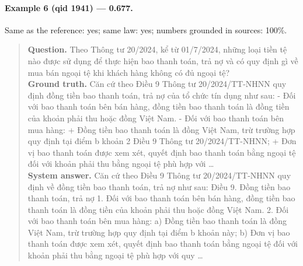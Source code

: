 \paragraph{Example 6 (qid 1941) --- \rl{} 0.677.} Same \dieu{} as the reference: yes; same law: yes; numbers grounded in sources: 100\%.
\begin{quote}\small\textbf{Question.} Theo Thông tư 20/2024, kể từ 01/7/2024, những loại tiền tệ nào được sử dụng để thực hiện bao thanh toán, trả nợ và có quy định gì về mua bán ngoại tệ khi khách hàng không có đủ ngoại tệ?\\[2pt]
\textbf{Ground truth.} Căn cứ theo Điều 9 Thông tư 20/2024/TT-NHNN quy định đồng tiền bao thanh toán, trả nợ của tổ chức tín dụng như sau: - Đối với bao thanh toán bên bán hàng, đồng tiền bao thanh toán là đồng tiền của khoản phải thu hoặc đồng Việt Nam. - Đối với bao thanh toán bên mua hàng: + Đồng tiền bao thanh toán là đồng Việt Nam, trừ trường hợp quy định tại điểm b khoản 2 Điều 9 Thông tư 20/2024/TT-NHNN; + Đơn vị bao thanh toán được xem xét, quyết định bao thanh toán bằng ngoại tệ đối với khoản phải thu bằng ngoại tệ phù hợp với …\\[2pt]
\textbf{System answer.} Căn cứ theo Điều 9 Thông tư 20/2024/TT-NHNN quy định về đồng tiền bao thanh toán, trả nợ như sau: Điều 9. Đồng tiền bao thanh toán, trả nợ 1. Đối với bao thanh toán bên bán hàng, đồng tiền bao thanh toán là đồng tiền của khoản phải thu hoặc đồng Việt Nam. 2. Đối với bao thanh toán bên mua hàng: a) Đồng tiền bao thanh toán là đồng Việt Nam, trừ trường hợp quy định tại điểm b khoản này; b) Đơn vị bao thanh toán được xem xét, quyết định bao thanh toán bằng ngoại tệ đối với khoản phải thu bằng ngoại tệ phù hợp với quy …\end{quote}

